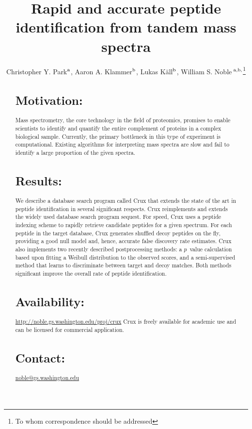 \documentclass{bioinfo}
\begin{document}

\title[Rapid and accurate peptide identification]{Rapid and accurate
  peptide identification from tandem mass spectra}
\author[Park \textit{et~al}]{Christopher Y. Park$^{\rm a}$,
Aaron A. Klammer$^{\rm b}$,
Lukas K\"{a}ll$^{\rm b}$, 
William S. Noble\,$^{\rm a,b,}$\footnote{To whom correspondence should be addressed}}
\address{
$^{\rm a}$Department of Computer Science and Engineering,
$^{\rm b}$Department of Genome Sciences, University of Washington,
  Seattle, WA, USA
}


\maketitle

\begin{abstract}
\section{Motivation:}  Mass spectrometry, the core technology in the
field of proteomics, promises to enable scientists to identify and
quantify the entire complement of proteins in a complex biological
sample.  Currently, the primary bottleneck in this type of experiment
is computational.  Existing algorithms for interpreting mass spectra
are slow and fail to identify a large proportion of the given spectra.

\section{Results:} We describe a database search program called Crux
that extends the state of the art in peptide identification in several
significant respects.  Crux reimplements and extends the widely used
database search program {\sc sequest}.  For speed, Crux uses a peptide
indexing scheme to rapidly retrieve candidate peptides for a given
spectrum.  For each peptide in the target database, Crux generates
shuffled decoy peptides on the fly, providing a good null model and,
hence, accurate false discovery rate estimates.  Crux also implements
two recently described postprocessing methods: a $p$~value calculation
based upon fitting a Weibull distribution to the observed scores, and
a semi-supervised method that learns to discriminate between target
and decoy matches.  Both methods significant improve the overall rate
of peptide identification.

\section{Availability:}
\href{http://noble.gs.washington.edu/proj/crux}{http://noble.gs.washington.edu/proj/crux}
Crux is freely available for academic use and can be licensed for
commercial application.
\section{Contact:} \href{noble@gs.washington.edu}{noble@gs.washington.edu}
\end{abstract}
\end{document}
